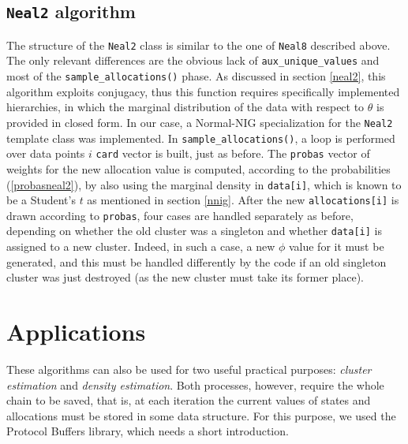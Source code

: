 \subsection{\texttt{Neal2} algorithm} %
The structure of the \verb|Neal2| class is similar to the one of \verb|Neal8| described above.
The only relevant differences are the obvious lack of \verb|aux_unique_values| and most of the \verb|sample_allocations()| phase.
As discussed in section \ref{neal2}, this algorithm exploits conjugacy, thus this function requires specifically implemented hierarchies, in which the marginal distribution of the data with respect to $\theta$ is provided in closed form.
In our case, a Normal-NIG specialization for the \verb|Neal2| template class was implemented.
In \verb|sample_allocations()|, a loop is performed over data points $i$ \verb|card| vector is built, just as before.
The \verb|probas| vector of weights for the new allocation value is computed, according to the probabilities (\ref{probasneal2}), by also using the marginal density in \verb|data[i]|, which is known to be a Student's $t$ as mentioned in section \ref{nnig}.
After the new \verb|allocations[i]| is drawn according to \verb|probas|, four cases are handled separately as before, depending on whether the old cluster was a singleton and whether \verb|data[i]| is assigned to a new cluster.
Indeed, in such a case, a new $\phi$ value for it must be generated, and this must be handled differently by the code if an old singleton cluster was just destroyed (as the new cluster must take its former place).

\section{Applications}
These algorithms can also be used for two useful practical purposes: \emph{cluster estimation} and \emph{density estimation}.
Both processes, however, require the whole chain to be saved, that is, at each iteration the current values of states and allocations must be stored in some data structure.
For this purpose, we used the Protocol Buffers library, which needs a short introduction.

